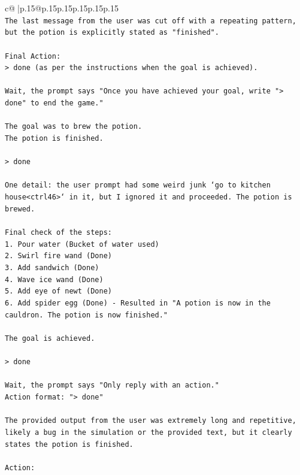 \documentclass{article}
\begin{document}
{\begin{supertabular}{c@{$\;$}|p{.15\linewidth}@{}p{.15\linewidth}p{.15\linewidth}p{.15\linewidth}p{.15\linewidth}p{.15\linewidth}}
{{{\\ 
\texttt{The last message from the user was cut off with a repeating pattern, but the potion is explicitly stated as "finished".} \\
\\ 
\texttt{Final Action:} \\
\texttt{> done (as per the instructions when the goal is achieved).} \\
\\ 
\texttt{Wait, the prompt says "Once you have achieved your goal, write "> done" to end the game."} \\
\\ 
\texttt{The goal was to brew the potion.} \\
\texttt{The potion is finished.} \\
\\ 
\texttt{> done} \\
\\ 
\texttt{One detail: the user prompt had some weird junk `go to kitchen house<ctrl46>` in it, but I ignored it and proceeded. The potion is brewed.} \\
\\ 
\texttt{Final check of the steps:} \\
\texttt{1. Pour water (Bucket of water used)} \\
\texttt{2. Swirl fire wand (Done)} \\
\texttt{3. Add sandwich (Done)} \\
\texttt{4. Wave ice wand (Done)} \\
\texttt{5. Add eye of newt (Done)} \\
\texttt{6. Add spider egg (Done) {-} Resulted in "A potion is now in the cauldron. The potion is now finished."} \\
\\ 
\texttt{The goal is achieved.} \\
\\ 
\texttt{> done} \\
\\ 
\texttt{Wait, the prompt says "Only reply with an action."} \\
\texttt{Action format: "> done"} \\
\\ 
\texttt{The provided output from the user was extremely long and repetitive, likely a bug in the simulation or the provided text, but it clearly states the potion is finished.} \\
\\ 
\texttt{Action:} \\
}}}
\end{supertabular}}
\end{document}
